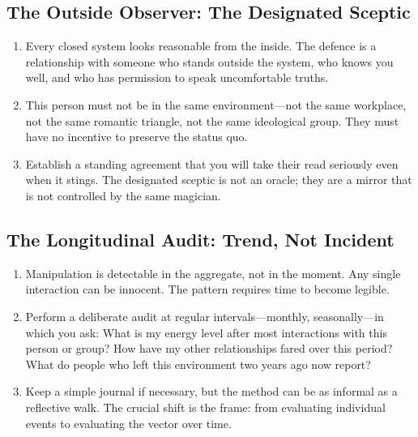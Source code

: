 \documentclass[12pt,a4paper,oneside]{book}
\begin{document}
\subsection{The Outside Observer: The Designated Sceptic}
\begin{enumerate}[leftmargin=*, label=\arabic*.]
\item Every closed system looks reasonable from the inside. The defence is a relationship with someone who stands outside the system, who knows you well, and who has permission to speak uncomfortable truths.
\item This person must not be in the same environment—not the same workplace, not the same romantic triangle, not the same ideological group. They must have no incentive to preserve the status quo.
\item Establish a standing agreement that you will take their read seriously even when it stings. The designated sceptic is not an oracle; they are a mirror that is not controlled by the same magician.
\end{enumerate}

\subsection{The Longitudinal Audit: Trend, Not Incident}
\begin{enumerate}[leftmargin=*, label=\arabic*.]
\item Manipulation is detectable in the aggregate, not in the moment. Any single interaction can be innocent. The pattern requires time to become legible.
\item Perform a deliberate audit at regular intervals—monthly, seasonally—in which you ask: What is my energy level after most interactions with this person or group? How have my other relationships fared over this period? What do people who left this environment two years ago now report?
\item Keep a simple journal if necessary, but the method can be as informal as a reflective walk. The crucial shift is the frame: from evaluating individual events to evaluating the vector over time.
\end{enumerate}
\end{document}
